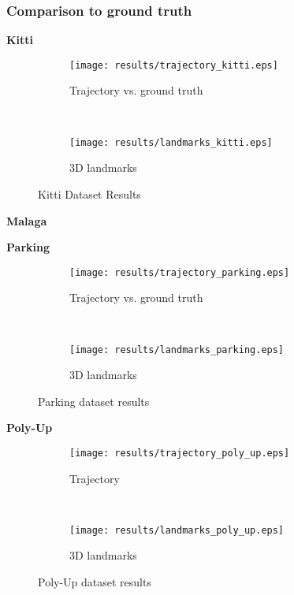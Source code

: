 \subsubsection{Comparison to ground truth}
\textbf{Kitti}
\begin{figure*}[ht!]
    \centering
    \begin{subfigure}[t]{0.5\textwidth}
        \centering
        \texttt{[image: results/trajectory\_kitti.eps]}
        \caption{Trajectory vs. ground truth}
    \end{subfigure}%
    ~ 
    \begin{subfigure}[t]{0.5\textwidth}
        \centering
        \texttt{[image: results/landmarks\_kitti.eps]}
        \caption{3D landmarks}
    \end{subfigure}
    \caption{Kitti Dataset Results}
		\label{parking_result_fig}
\end{figure*}

\textbf{Malaga}


\textbf{Parking}
\begin{figure*}[ht!]
    \centering
    \begin{subfigure}[t]{0.5\textwidth}
        \centering
        \texttt{[image: results/trajectory\_parking.eps]}
        \caption{Trajectory vs. ground truth}
    \end{subfigure}%
    ~ 
    \begin{subfigure}[t]{0.5\textwidth}
        \centering
        \texttt{[image: results/landmarks\_parking.eps]}
        \caption{3D landmarks}
    \end{subfigure}
    \caption{Parking dataset results}
		\label{parking_result_fig}
\end{figure*}

\textbf{Poly-Up}
\begin{figure*}[ht!]
    \centering
    \begin{subfigure}[t]{0.5\textwidth}
        \centering
        \texttt{[image: results/trajectory\_poly\_up.eps]}
        \caption{Trajectory}
    \end{subfigure}%
    ~ 
    \begin{subfigure}[t]{0.5\textwidth}
        \centering
        \texttt{[image: results/landmarks\_poly\_up.eps]}
        \caption{3D landmarks}
    \end{subfigure}
    \caption{Poly-Up dataset results}
		\label{poly_up_result_fig}
\end{figure*}

